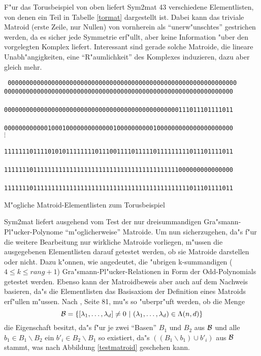 F"ur das Torusbeispiel von oben liefert {\sc Sym2mat} 43 verschiedene
Elementlisten, von denen ein Teil in Tabelle \ref{tormat} dargestellt ist.
Dabei kann das triviale Matroid (erste Zeile, nur Nullen) von vornherein als
"`unerw"unschtes"' gestrichen werden, da es sicher jede Symmetrie erf"ullt,
aber keine Information "uber den vorgelegten Komplex liefert. Interessant sind
gerade solche Matroide, die lineare Unabh"angigkeiten, eine "`R"aumlichkeit"'
des Komplexes induzieren, dazu aber gleich mehr.

\begin{table}[htb]
\begin{center}
{\scriptsize\tt
{}
000000000000000000000000000000000000000000000000000000000000000\\
000000000000000000000000000000000000000000000000000000000000000\\
\\
000000000000000000000000000000000000000000000000111011101111011\\
\\
000000000000100010000000000000100000000001000000000000000000000\\
\hline
$\vdots$\\
\\
111111101111010101111111101110011110111110111111111011101111011\\
\\
111111101111111111111111111111111111111111111111000000000000000\\
\\
111111101111111111111111111111111111111111111111111011101111011
\etab
}
\end{center}
\caption{M"ogliche Matroid-Elementlisten zum Torusbeispiel}
\label{tormat}
\end{table}

{\sc Sym2mat} liefert ausgehend vom Test der nur dreisummandigen
Gra"smann-Pl"ucker-Polynome "`m"oglicherweise"' Matroide. Um nun sicherzugehen,
da"s f"ur die weitere Bearbeitung nur wirkliche Matroide vorliegen, m"ussen die
ausgegebenen Elementlisten darauf getestet werden, ob sie Matroide darstellen
oder nicht. Dazu k"onnen, wie angedeutet, die "ubrigen k-summandigen
($4\leq k\leq rang+1$) Gra"smann-Pl"ucker-Relationen in Form der
Odd-Polynomials getestet werden. Ebenso kann der Matroidbeweis aber auch auf
dem Nachweis basieren, da"s die Elementlisten das Basisaxiom der Definition
eines Matroids erf"ullen m"ussen. Nach \cite{Bj:93}, Seite 81, mu"s
so "uberpr"uft werden, ob die Menge
$${\cal B}=\{[\lambda_1,\ldots,\lambda_d]\neq 0~|~(\lambda_1,\ldots,\lambda_d)
\in\Lambda (n,d)\}$$
die Eigenschaft besitzt, da"s f"ur je zwei "`Basen"' $B_1$ und $B_2$ aus
$\cal B$ und alle $b_1\in B_1\backslash B_2$ ein $b'_i\in B_2\backslash B_1$
so existiert, da"s $((B_1\backslash b_1)\cup b'_i)$ aus $\cal B$ stammt, was
nach Abbildung \ref{testmatroid} geschehen kann.

